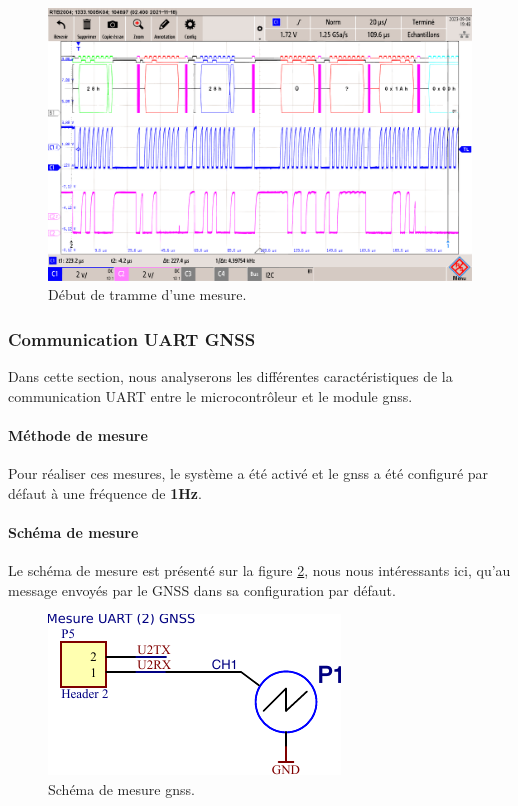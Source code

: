 \begin{figure}[H]
	\centering
	\includegraphics[width=.7\linewidth]{../figures/mesures/I2C/Tramme-mesure}
	\caption{Début de tramme d'une mesure.}
	\label{fig:tramme-mesure}
\end{figure}

\clearpage

\subsubsection{Communication UART GNSS} \label{ssec:Comm-UART}
Dans cette section, nous analyserons les différentes caractéristiques de la communication UART entre le microcontrôleur et le module \gls{gnss}.

\paragraph{Méthode de mesure} Pour réaliser ces mesures, le système a été activé et le \gls{gnss} a été configuré par défaut à une fréquence de \textbf{1Hz}.

\paragraph{Schéma de mesure} Le schéma de mesure est présenté sur la figure \ref{fig:scheam-mesure-uart-gnss}, nous nous intéressants ici, qu'au message envoyés par le GNSS dans sa configuration par défaut. 
\begin{figure}[h]
	\centering
	\includegraphics[width=0.4\linewidth]{../figures/mesures/UART/scheam-mesure-uart-gnss}
	\caption{Schéma de mesure \gls{gnss}.}
	\label{fig:scheam-mesure-uart-gnss}
\end{figure}



